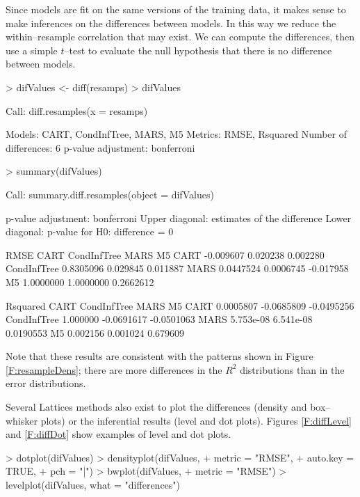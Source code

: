 \documentclass[12pt]{article}
\renewenvironment{Schunk}{\vspace{\topsep}}{\vspace{\topsep}}
\begin{document}
Since models are fit on the same versions of the training data, it
makes sense to make inferences on the differences between models. In
this way we reduce the within--resample correlation that may exist. We
can compute the differences, then use a simple $t$--test to evaluate
the null hypothesis that there is no difference between models. 

\begin{Schunk}
\begin{Sinput}
> difValues <- diff(resamps)
> difValues
\end{Sinput}
\begin{Soutput}
Call:
diff.resamples(x = resamps)

Models: CART, CondInfTree, MARS, M5 
Metrics: RMSE, Rsquared 
Number of differences: 6 
p-value adjustment: bonferroni 
\end{Soutput}
\begin{Sinput}
> summary(difValues)
\end{Sinput}
\begin{Soutput}
Call:
summary.diff.resamples(object = difValues)

p-value adjustment: bonferroni 
Upper diagonal: estimates of the difference
Lower diagonal: p-value for H0: difference = 0

RMSE 
            CART      CondInfTree MARS      M5       
CART                  -0.009607    0.020238  0.002280
CondInfTree 0.8305096              0.029845  0.011887
MARS        0.0447524 0.0006745             -0.017958
M5          1.0000000 1.0000000   0.2662612          

Rsquared 
            CART      CondInfTree MARS       M5        
CART                   0.0005807  -0.0685809 -0.0495256
CondInfTree 1.000000              -0.0691617 -0.0501063
MARS        5.753e-08 6.541e-08               0.0190553
M5          0.002156  0.001024    0.679609             
\end{Soutput}
\end{Schunk}
Note that these results are consistent with the patterns shown in
Figure \ref{F:resampleDens}; there are more differences in the $R^2$
distributions than in the error distributions.

Several Lattices methods also exist to plot the differences (density
and box--whisker plots) or the inferential results (level and dot
plots). Figures \ref{F:diffLevel} and \ref{F:diffDot} show examples of
level and dot plots.

\begin{Schunk}
\begin{Sinput}
> dotplot(difValues)
> densityplot(difValues,
+             metric = "RMSE",
+             auto.key = TRUE,
+             pch = "|")
> bwplot(difValues,
+        metric = "RMSE")
> levelplot(difValues, what = "differences")
\end{Sinput}
\end{Schunk}
\end{document}
